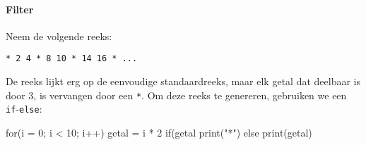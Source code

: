 \paragraph{Filter}

Neem de volgende reeks:

\begin{verbatim}
* 2 4 * 8 10 * 14 16 * ...
\end{verbatim}

De reeks lijkt erg op de eenvoudige standaardreeks, maar elk getal dat deelbaar is door 3, is vervangen door een \texttt{*}. Om deze reeks te genereren, gebruiken we een \texttt{if}-\texttt{else}:

\begin{nnflisting}
for(i = 0; i < 10; i++)
    getal = i * 2
    if(getal %
        print("*")
    else
        print(getal)
\end{nnflisting}

%
%






